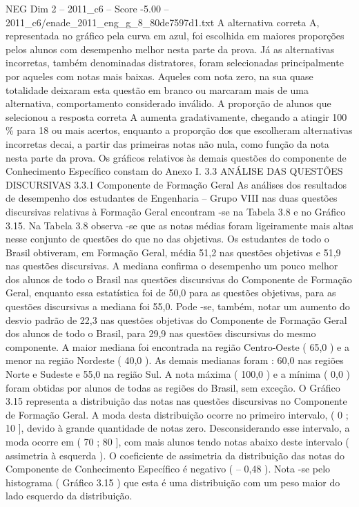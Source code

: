 \begin{textsample}{NEG Dim 2 – 2011\_c6 – Score -5.00 – 2011\_c6/enade\_2011\_eng\_g\_8\_80de7597d1.txt}
A alternativa correta A, representada no gráfico pela curva em azul, foi escolhida em maiores proporções pelos alunos com desempenho melhor nesta parte da prova.
Já as alternativas incorretas, também denominadas distratores, foram selecionadas principalmente por aqueles com notas mais baixas.
Aqueles com nota zero, na sua quase totalidade deixaram esta questão em branco ou marcaram mais de uma alternativa, comportamento considerado inválido.
A proporção de alunos que selecionou a resposta correta A aumenta gradativamente, chegando a atingir 100 \% para 18 ou mais acertos, enquanto a proporção dos que escolheram alternativas incorretas decai, a partir das primeiras notas não nula, como função da nota nesta parte da prova.
Os gráficos relativos às demais questões do componente de Conhecimento Específico constam do Anexo I. 3.3 ANÁLISE DAS QUESTÕES DISCURSIVAS 3.3.1 Componente de Formação Geral As análises dos resultados de desempenho dos estudantes de Engenharia – Grupo VIII nas duas questões discursivas relativas à Formação Geral encontram -se na Tabela 3.8 e no Gráfico 3.15.
Na Tabela 3.8 observa -se que as notas médias foram ligeiramente mais altas nesse conjunto de questões do que no das objetivas.
Os estudantes de todo o Brasil obtiveram, em Formação Geral, média 51,2 nas questões objetivas e 51,9 nas questões discursivas.
A mediana confirma o desempenho um pouco melhor dos alunos de todo o Brasil nas questões discursivas do Componente de Formação Geral, enquanto essa estatística foi de 50,0 para as questões objetivas, para as questões discursivas a mediana foi 55,0.
Pode -se, também, notar um aumento do desvio padrão de 22,3 nas questões objetivas do Componente de Formação Geral dos alunos de todo o Brasil, para 29,9 nas questões discursivas do mesmo componente.
A maior mediana foi encontrada na região Centro-Oeste ( 65,0 ) e a menor na região Nordeste ( 40,0 ).
As demais medianas foram : 60,0 nas regiões Norte e Sudeste e 55,0 na região Sul.
A nota máxima ( 100,0 ) e a mínima ( 0,0 ) foram obtidas por alunos de todas as regiões do Brasil, sem exceção.
O Gráfico 3.15 representa a distribuição das notas nas questões discursivas no Componente de Formação Geral.
A moda desta distribuição ocorre no primeiro intervalo, ( 0 ; 10 ], devido à grande quantidade de notas zero.
Desconsiderando esse intervalo, a moda ocorre em ( 70 ; 80 ], com mais alunos tendo notas abaixo deste intervalo ( assimetria à esquerda ).
O coeficiente de assimetria da distribuição das notas do Componente de Conhecimento Específico é negativo ( – 0,48 ).
Nota -se pelo histograma ( Gráfico 3.15 ) que esta é uma distribuição com um peso maior do lado esquerdo da distribuição.

\end{textsample}

